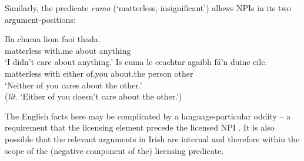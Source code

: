 \documentclass[output=paper,colorlinks,citecolor=brown]{langscibook}
\begin{document}

Similarly, the predicate {\itshape cuma} (`matterless, insignificant') allows NPIs in its two argument-positions: 

\ea\label{ex:cuma}
\ea
\gll Ba chuma liom faoi thada. \\
     {\ba} matterless with.me about anything \\
\glt `I didn't care about anything.'
\ex
\gll Is cuma le ceachtar agaibh fá'n duine eile. \\
     {\cop} matterless with either of.you about.the person other \\
\glt `Neither of you cares about the other.' \\
({\itshape lit}. `Either of you doesn't care about the other.')
\z
\z


The English facts here may be complicated by a language\hyp particular oddity -- a requirement that the licensing element precede the licensed NPI \citep[206--207]{ladusaw:79}. It is also possible that the relevant arguments in Irish are internal and therefore within the scope of the (negative component of the) licensing predicate.
\end{document}
